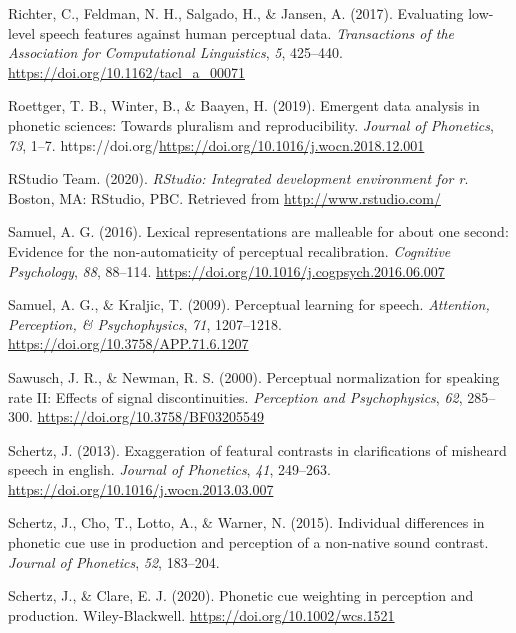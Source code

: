 \documentclass[
  11pt,
  english,
  man,floatsintext]{apa6}
\newlength{\cslhangindent}
\newlength{\cslentryspacingunit} %
\newenvironment{CSLReferences}[2] %
 {%
  \setlength{\parindent}{0pt}
  \ifodd #1
  \let\oldpar\par
  \def\par{\hangindent=\cslhangindent\oldpar}
  \fi
  \setlength{\parskip}{#2\cslentryspacingunit}
 }%
 {}
\begin{document}
\begin{CSLReferences}{1}{0}
\leavevmode{}%
Richter, C., Feldman, N. H., Salgado, H., \& Jansen, A. (2017). Evaluating low-level speech features against human perceptual data. \emph{Transactions of the Association for Computational Linguistics}, \emph{5}, 425--440. \url{https://doi.org/10.1162/tacl_a_00071}

\leavevmode{}%
Roettger, T. B., Winter, B., \& Baayen, H. (2019). Emergent data analysis in phonetic sciences: Towards pluralism and reproducibility. \emph{Journal of Phonetics}, \emph{73}, 1--7. https://doi.org/\url{https://doi.org/10.1016/j.wocn.2018.12.001}

\leavevmode{}%
RStudio Team. (2020). \emph{RStudio: Integrated development environment for r}. Boston, MA: RStudio, PBC. Retrieved from \url{http://www.rstudio.com/}

\leavevmode{}%
Samuel, A. G. (2016). Lexical representations are malleable for about one second: Evidence for the non-automaticity of perceptual recalibration. \emph{Cognitive Psychology}, \emph{88}, 88--114. \url{https://doi.org/10.1016/j.cogpsych.2016.06.007}

\leavevmode{}%
Samuel, A. G., \& Kraljic, T. (2009). Perceptual learning for speech. \emph{Attention, Perception, \& Psychophysics}, \emph{71}, 1207--1218. \url{https://doi.org/10.3758/APP.71.6.1207}

\leavevmode{}%
Sawusch, J. R., \& Newman, R. S. (2000). Perceptual normalization for speaking rate II: Effects of signal discontinuities. \emph{Perception and Psychophysics}, \emph{62}, 285--300. \url{https://doi.org/10.3758/BF03205549}

\leavevmode{}%
Schertz, J. (2013). Exaggeration of featural contrasts in clarifications of misheard speech in english. \emph{Journal of Phonetics}, \emph{41}, 249--263. \url{https://doi.org/10.1016/j.wocn.2013.03.007}

\leavevmode{}%
Schertz, J., Cho, T., Lotto, A., \& Warner, N. (2015). Individual differences in phonetic cue use in production and perception of a non-native sound contrast. \emph{Journal of Phonetics}, \emph{52}, 183--204.

\leavevmode{}%
Schertz, J., \& Clare, E. J. (2020). Phonetic cue weighting in perception and production. Wiley-Blackwell. \url{https://doi.org/10.1002/wcs.1521}


\end{CSLReferences}
\end{document}
